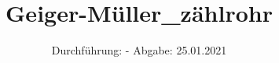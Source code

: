 

\subject{703}
\title{Geiger-Müller_zählrohr}
\date{%
  Durchführung: -
  \hspace{3em}
  Abgabe: 25.01.2021
}



\maketitle
\thispagestyle{empty}
\tableofcontents
\newpage






\printbibliography{}


